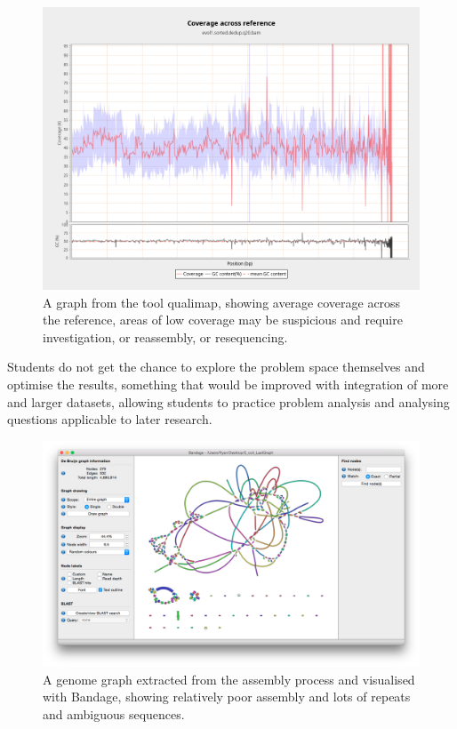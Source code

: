 \documentclass[paper=a4,justified,a4paper]{tufte-handout}
\begin{document}
\begin{figure}
\centering
\includegraphics{./coverage.png}
\caption{A graph from the tool qualimap, showing average coverage across
the reference, areas of low coverage may be suspicious and require
investigation, or reassembly, or resequencing.\label{fig:qualimap}}
\end{figure}

Students do not get the chance to explore the problem space themselves
and optimise the results, something that would be improved with
integration of more and larger datasets, allowing students to practice
problem analysis and analysing questions applicable to later research.

\begin{figure}
\centering
\includegraphics{./bandage_gui.png}
\caption{A genome graph extracted from the assembly process and
visualised with Bandage, showing relatively poor assembly and lots of
repeats and ambiguous sequences.\label{fig:bandage}}
\end{figure}
\end{document}
